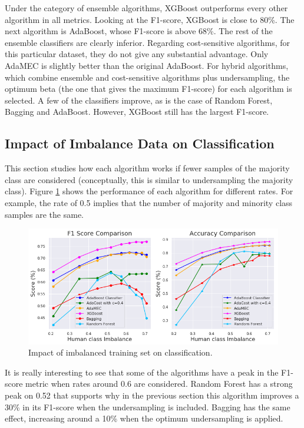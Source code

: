 \documentclass[conference]{IEEEtran}
\begin{document}
Under the category of ensemble  algorithms, XGBoost outperforms every other algorithm in all metrics. Looking at the F1-score, XGBoost is close to 80\%. The next algorithm is AdaBoost, whose F1-score is above 68\%. The rest of the ensemble classifiers are clearly inferior. Regarding cost-sensitive algorithms, for this particular dataset, they do not give any substantial advantage. Only AdaMEC is slightly better than the original AdaBoost. For hybrid algorithms, which combine ensemble and cost-sensitive algorithms plus undersampling, the optimum beta (the one that gives the maximum F1-score) for each algorithm is selected. A few of the classifiers improve, as is the case of Random Forest, Bagging and AdaBoost. However, XGBoost still has the largest F1-score.

\subsection{Impact of Imbalance Data on Classification}

This section studies how each algorithm works if fewer samples of the majority class are considered (conceptually, this is similar to undersampling the majority class). Figure \ref{Fig:ImbalanceComparison} shows the performance of each algorithm for different rates. For example, the rate of 0.5 implies that the number of majority and minority class samples are the same.

\begin{figure}[htbp]
\centerline{\includegraphics[scale=0.35]{pictures/Imbalance_Comparison.png}}
\caption{Impact of imbalanced training set on classification.}
\label{Fig:ImbalanceComparison}
\end{figure}

It is really interesting to see that some of the algorithms have a peak in the F1-score metric when rates around 0.6 are considered. Random Forest has a strong peak on 0.52 that supports why in the previous section this algorithm improves a 30\% in its F1-score when the undersampling is included. Bagging has the same effect, increasing around a 10\% when the optimum undersampling is applied.  
\end{document}
